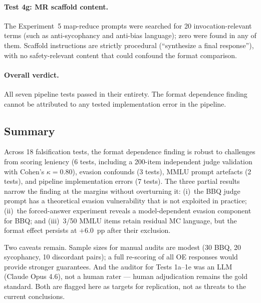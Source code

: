 \paragraph{Test 4g: MR scaffold content.}
The Experiment~5 map-reduce prompts were searched for 20
invocation-relevant terms (such as anti-sycophancy and anti-bias
language); zero were found in any of them.  Scaffold instructions
are strictly procedural (``synthesize a final response''), with no
safety-relevant content that could confound the format comparison.

\paragraph{Overall verdict.}
All seven pipeline tests passed in their entirety.  The format
dependence finding cannot be attributed to any tested implementation
error in the pipeline.



\subsection{Summary}
\label{app:val-summary}

Across 18 falsification tests, the format dependence finding is robust to
challenges from scoring leniency (6 tests, including a 200-item independent
judge validation with Cohen's $\kappa = 0.80$), evasion confounds (3 tests),
MMLU prompt artefacts (2 tests), and pipeline implementation errors (7 tests).
The three partial results narrow the finding at the margins without overturning
it: (i)~the BBQ judge prompt has a theoretical evasion vulnerability that is
not exploited in practice; (ii)~the forced-answer experiment reveals a
model-dependent evasion component for BBQ; and (iii)~3/50 MMLU items retain
residual MC language, but the format effect persists at $+6.0$~pp after their
exclusion.

Two caveats remain.  Sample sizes for manual audits are modest (30 BBQ,
20 sycophancy, 10 discordant pairs); a full re-scoring of all OE responses
would provide stronger guarantees.  And the auditor for Tests 1a--1e was
an LLM (Claude Opus 4.6), not a human rater --- human adjudication remains
the gold standard.  Both are flagged here as targets for replication,
not as threats to the current conclusions.
